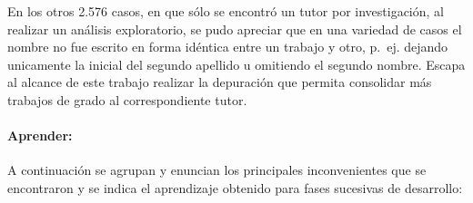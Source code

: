 \documentclass[
  12pt,
  openany]{book}
\begin{document}
En los otros 2.576 casos, en que sólo se encontró un tutor por investigación, al realizar un análisis exploratorio, se pudo apreciar que en una variedad de casos el nombre no fue escrito en forma idéntica entre un trabajo y otro, p.~ej. dejando unicamente la inicial del segundo apellido u omitiendo el segundo nombre. Escapa al alcance de este trabajo realizar la depuración que permita consolidar más trabajos de grado al correspondiente tutor.

\hypertarget{aprender-2}{%
\paragraph{Aprender:}\label{aprender-2}}

A continuación se agrupan y enuncian los principales inconvenientes que se encontraron y se indica el aprendizaje obtenido para fases sucesivas de desarrollo:
\end{document}
